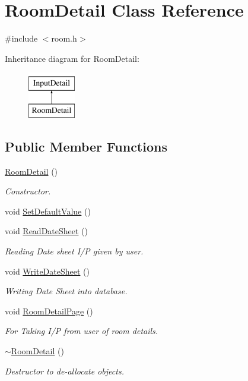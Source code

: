 \hypertarget{classRoomDetail}{\section{Room\-Detail Class Reference}
\label{classRoomDetail}
}


{\ttfamily \#include $<$room.\-h$>$}

Inheritance diagram for Room\-Detail\-:\begin{figure}[H]
\begin{center}
\leavevmode
\includegraphics[height=2.000000cm]{classRoomDetail}
\end{center}
\end{figure}
\subsection*{Public Member Functions}
\begin{DoxyCompactItemize}
\item 
\hyperlink{classRoomDetail_acbbb21580bc1591daf23e614011acc06}{Room\-Detail} ()
\begin{DoxyCompactList}\small\item\em Constructor. \end{DoxyCompactList}\item 
void \hyperlink{classRoomDetail_a117bed37b0f95b364b7133fe13afa9b7}{Set\-Default\-Value} ()
\item 
void \hyperlink{classRoomDetail_ab8a07fd05ab314e85b374191e38e8556}{Read\-Date\-Sheet} ()
\begin{DoxyCompactList}\small\item\em Reading Date sheet I/\-P given by user. \end{DoxyCompactList}\item 
void \hyperlink{classRoomDetail_a90d4fc5bf3497068efecb5c9ec13e887}{Write\-Date\-Sheet} ()
\begin{DoxyCompactList}\small\item\em Writing Date Sheet into database. \end{DoxyCompactList}\item 
void \hyperlink{classRoomDetail_a22f437f08d38ac6b878450e7d0e43dff}{Room\-Detail\-Page} ()
\begin{DoxyCompactList}\small\item\em For Taking I/\-P from user of room details. \end{DoxyCompactList}\item 
\hyperlink{classRoomDetail_ae65b9b167e75a7dc994c4e2021937c68}{$\sim$\-Room\-Detail} ()
\begin{DoxyCompactList}\small\item\em Destructor to de-\/allocate objects. \end{DoxyCompactList}\end{DoxyCompactItemize}
